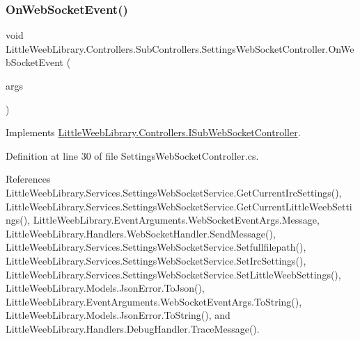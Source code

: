 \subsubsection{\texorpdfstring{On\+Web\+Socket\+Event()}{OnWebSocketEvent()}}
{\footnotesize\ttfamily void Little\+Weeb\+Library.\+Controllers.\+Sub\+Controllers.\+Settings\+Web\+Socket\+Controller.\+On\+Web\+Socket\+Event (\begin{DoxyParamCaption}\item[{\mbox{\hyperlink{class_little_weeb_library_1_1_event_arguments_1_1_web_socket_event_args}{Web\+Socket\+Event\+Args}}}]{args }\end{DoxyParamCaption})}



Implements \mbox{\hyperlink{interface_little_weeb_library_1_1_controllers_1_1_i_sub_web_socket_controller_adcb26b7b397d6a67ccbf114008c29985}{Little\+Weeb\+Library.\+Controllers.\+I\+Sub\+Web\+Socket\+Controller}}.



Definition at line 30 of file Settings\+Web\+Socket\+Controller.\+cs.



References Little\+Weeb\+Library.\+Services.\+Settings\+Web\+Socket\+Service.\+Get\+Current\+Irc\+Settings(), Little\+Weeb\+Library.\+Services.\+Settings\+Web\+Socket\+Service.\+Get\+Current\+Little\+Weeb\+Settings(), Little\+Weeb\+Library.\+Event\+Arguments.\+Web\+Socket\+Event\+Args.\+Message, Little\+Weeb\+Library.\+Handlers.\+Web\+Socket\+Handler.\+Send\+Message(), Little\+Weeb\+Library.\+Services.\+Settings\+Web\+Socket\+Service.\+Setfullfilepath(), Little\+Weeb\+Library.\+Services.\+Settings\+Web\+Socket\+Service.\+Set\+Irc\+Settings(), Little\+Weeb\+Library.\+Services.\+Settings\+Web\+Socket\+Service.\+Set\+Little\+Weeb\+Settings(), Little\+Weeb\+Library.\+Models.\+Json\+Error.\+To\+Json(), Little\+Weeb\+Library.\+Event\+Arguments.\+Web\+Socket\+Event\+Args.\+To\+String(), Little\+Weeb\+Library.\+Models.\+Json\+Error.\+To\+String(), and Little\+Weeb\+Library.\+Handlers.\+Debug\+Handler.\+Trace\+Message().


